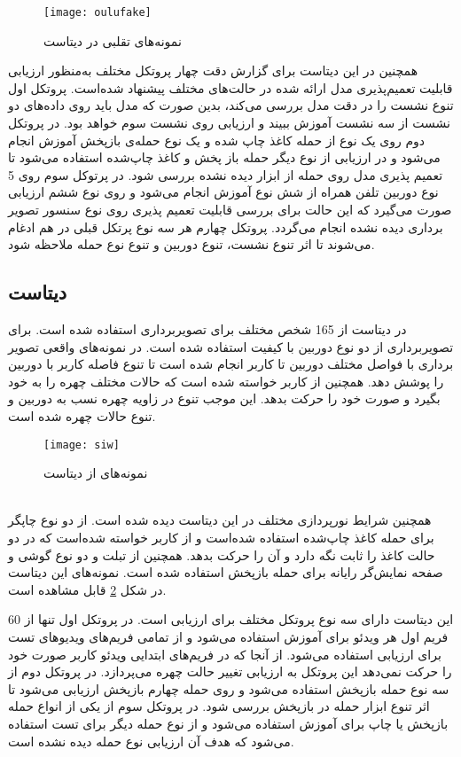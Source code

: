  
  \begin{figure}[h]
 	\centerline{\texttt{[image: oulufake]}}
 	\caption{نمونه‌های تقلبی در دیتاست  \cite{boulkenafet2017oulu} }
 	\label{fig:oulufake}
 \end{figure}
 
همچنین در این دیتاست برای گزارش دقت چهار پروتکل مختلف به‌منظور ارزیابی قابلیت تعمیم‌پذیری مدل ارائه شده در حالت‌های مختلف پیشنهاد شده‌است. پروتکل اول تنوع نشست را در دقت مدل بررسی می‌کند، بدین صورت که مدل باید روی داده‌های دو نشست از سه نشست آموزش ببیند و ارزیابی روی نشست سوم خواهد بود. در پروتکل دوم روی یک نوع از حمله کاغذ چاپ شده و یک نوع حمله‌ی بازپخش آموزش انجام می‌شود و در ارزیابی از نوع دیگر حمله باز پخش و کاغذ چاپ‌شده استفاده می‌شود تا تعمیم پذیری مدل روی حمله از ابزار دیده نشده بررسی شود. در پرتوکل سوم روی 5 نوع دوربین تلفن همراه از شش نوع آموزش انجام می‌شود و روی نوع ششم ارزیابی صورت می‌گیرد که این حالت برای بررسی قابلیت تعمیم پذیری روی نوع سنسور تصویر برداری دیده نشده انجام می‌گردد. پروتکل چهارم هر سه نوع پرتکل قبلی در هم ادغام می‌شوند تا اثر تنوع نشست، تنوع دوربین و تنوع نوع حمله ملاحظه شود.
\subsection{دیتاست }
در دیتاست 
\cite{liu2018learning}
از 165 شخص مختلف برای تصویربرداری استفاده شده است. برای تصویربرداری از دو نوع دوربین با کیفیت استفاده شده است. در نمونه‌های واقعی تصویر برداری با فواصل مختلف دوربین تا کاربر انجام شده است تا تنوع فاصله کاربر با دوربین را پوشش دهد. همچنین از کاربر خواسته شده است که حالات مختلف چهره را به خود بگیرد و صورت خود را حرکت بدهد. این موجب تنوع در زاویه چهره نسب به دوربین و تنوع حالات چهره شده است.
  \begin{figure}[h]
	\centerline{\texttt{[image: siw]}}
	\caption{نمونه‌های از دیتاست  \cite{liu2018learning} }
	\label{fig:siw}
\end{figure}
\\

 همچنین شرایط نورپردازی مختلف در این دیتاست دیده شده است. از دو نوع چاپگر برای حمله کاغذ چاپ‌شده استفاده شده‌است و از کاربر خواسته شده‌است که در دو حالت کاغذ را ثابت نگه دارد و آن را حرکت بدهد. همچنین از تبلت و دو نوع گوشی و صفحه نمایش‌گر رایانه برای حمله بازپخش استفاده شده است. نمونه‌های این دیتاست در  شکل 
\ref{fig:siw}
قابل مشاهده است. 


این دیتاست دارای سه نوع پروتکل مختلف برای ارزیابی است. در پروتکل اول تنها از 60 فریم اول هر ویدئو برای آموزش استفاده می‌شود و از تمامی فریم‌های ویدیوهای تست برای ارزیابی استفاده می‌شود. از آنجا که در فریم‌های ابتدایی ویدئو کاربر صورت خود را حرکت نمی‌دهد این پروتکل به ارزیابی تغییر حالت چهره می‌پردازد. در پروتکل دوم از سه نوع حمله بازپخش استفاده می‌شود و روی حمله چهارم بازپخش ارزیابی می‌شود تا اثر تنوع ابزار حمله در بازپخش بررسی شود. در پروتکل سوم از یکی از انواع حمله بازپخش یا چاپ برای آموزش استفاده می‌شود و از نوع حمله دیگر برای تست استفاده می‌شود که هدف آن ارزیابی نوع حمله دیده نشده است. 





 











 












